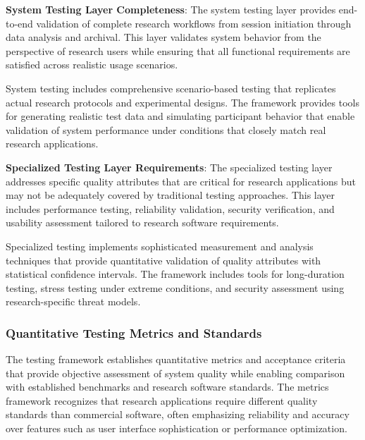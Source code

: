 \documentclass[11pt,a4paper]{report}
\begin{document}
\textbf{System Testing Layer Completeness}: The system testing layer provides end-to-end validation of complete research
workflows from session initiation through data analysis and archival. This layer validates system behavior from the
perspective of research users while ensuring that all functional requirements are satisfied across realistic usage
scenarios.

System testing includes comprehensive scenario-based testing that replicates actual research protocols and experimental
designs. The framework provides tools for generating realistic test data and simulating participant behavior that enable
validation of system performance under conditions that closely match real research applications.

\textbf{Specialized Testing Layer Requirements}: The specialized testing layer addresses specific quality attributes that are
critical for research applications but may not be adequately covered by traditional testing approaches. This layer
includes performance testing, reliability validation, security verification, and usability assessment tailored to
research software requirements.

Specialized testing implements sophisticated measurement and analysis techniques that provide quantitative validation of
quality attributes with statistical confidence intervals. The framework includes tools for long-duration testing, stress
testing under extreme conditions, and security assessment using research-specific threat models.

\subsubsection{Quantitative Testing Metrics and Standards}

The testing framework establishes quantitative metrics and acceptance criteria that provide objective assessment of
system quality while enabling comparison with established benchmarks and research software standards. The metrics
framework recognizes that research applications require different quality standards than commercial software, often
emphasizing reliability and accuracy over features such as user interface sophistication or performance optimization.
\end{document}
